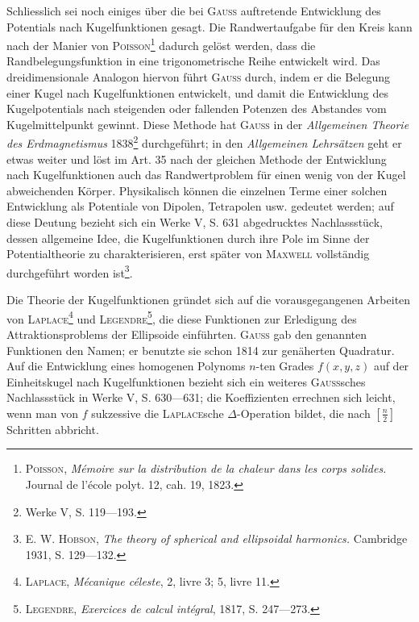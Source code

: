 Schliesslich sei noch einiges über die bei \textsc{Gauss} auftretende Entwicklung
des Potentials nach Kugelfunktionen gesagt. Die Randwertaufgabe für den
Kreis kann nach der Manier von \textsc{Poisson}\footnote{\textsc{Poisson}, \textit{Mémoire sur la distribution de la chaleur dans les corps solides.} Journal de l’école
polyt. 12, cah. 19, 1823.} dadurch gelöst werden, dass die
Randbelegungsfunktion in eine trigonometrische Reihe entwickelt wird. Das
dreidimensionale Analogon hiervon führt \textsc{Gauss} durch, indem er die Belegung
einer Kugel nach Kugelfunktionen entwickelt, und damit die Entwicklung des
Kugelpotentials nach steigenden oder fallenden Potenzen des Abstandes vom
Kugelmittelpunkt gewinnt. Diese Methode hat \textsc{Gauss} in der \textit{Allgemeinen Theorie
des Erdmagnetismus} 1838\footnote{Werke V, S. 119—193.} durchgeführt; in den \textit{Allgemeinen Lehrsätzen} geht
er etwas weiter und löst im Art. 35 nach der gleichen Methode der Entwicklung
nach Kugelfunktionen auch das Randwertproblem für einen wenig von
der Kugel abweichenden Körper. Physikalisch können die einzelnen Terme
einer solchen Entwicklung als Potentiale von Dipolen, Tetrapolen usw. gedeutet
werden; auf diese Deutung bezieht sich ein Werke V, S. 631 abgedrucktes
Nachlassstück, dessen allgemeine Idee, die Kugelfunktionen durch
ihre Pole im Sinne der Potentialtheorie zu charakterisieren, erst später von
\textsc{Maxwell} vollständig durchgeführt worden ist\footnote{\textsc{E. W. Hobson}, \textit{The theory of spherical and ellipsoidal harmonics.} Cambridge 1931, S. 129—132.}.

Die Theorie der Kugelfunktionen gründet sich auf die vorausgegangenen
Arbeiten von \textsc{Laplace}\footnote{\textsc{Laplace}, \textit{Mécanique céleste}, 2, livre 3; 5, livre 11.} und \textsc{Legendre}\footnote{\textsc{Legendre}, \textit{Exercices de calcul intégral}, 1817, S. 247—273.}, die diese Funktionen zur Erledigung
des Attraktionsproblems der Ellipsoide einführten. \textsc{Gauss} gab den genannten
\clearpage{}
\noindent Funktionen den Namen; er benutzte sie schon 1814 zur genäherten Quadratur.
Auf die Entwicklung eines homogenen Polynoms \(n\)-ten Grades \(f(x,y,z)\) auf
der Einheitskugel nach Kugelfunktionen bezieht sich ein weiteres \textsc{Gauss}sches
Nachlassstück in Werke V, S. 630—631; die Koeffizienten errechnen sich
leicht, wenn man von \(f\) sukzessive die \textsc{Laplace}sche \(\Delta\)-Operation bildet, die
nach \(\left[\frac n2\right]\) Schritten abbricht.
\clearpage\endgroup
